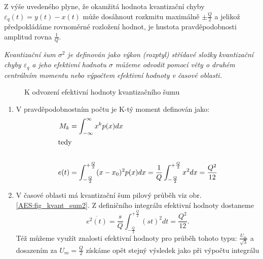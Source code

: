       Z výše uvedeného plyne, že okamžitá hodnota kvantizační chyby $\varepsilon_q(t) = y(t) - x(t)$ může dosáhnout rozkmitu maximálně $\pm \frac{Q}{2}$ a jelikož předpokládáme rovnoměrné rozložení hodnot, je hustota pravděpodobnosti amplitud rovna $\frac{1}{Q}$.

      \emph{Kvantizační šum $\sigma^2$ je definován jako výkon (rozptyl) střídavé složky kvantizační chyby $\varepsilon_q$ a jeho efektivní hodnotu $\sigma$ můžeme odvodit pomocí věty o druhém centrálním momentu nebo výpočtem efektivní hodnoty v časové oblasti.}

        \begin{figure}[ht!]
          \centering
          \caption{K odvození efektivní hodnoty kvantizačního šumu}
          \label{AES:fig_kvant_sum}
        \end{figure}

        \begin{enumerate}
          \item V pravděpodobnostním počtu je K-tý moment definován jako: 
                \begin{align*}
                  M_k  &= \int_{-\infty}^{\infty} x^k p(x)dx  \\
                  \shortintertext{tedy}                       \\
                  e(t) &= \int_{-\frac{Q}{2}}^{+\frac{Q}{2}}(x - x_0)^2p(x)dx = 
                                 \frac{1}{Q}\int_{-\frac{Q}{2}}^{+\frac{Q}{2}}x^2dx = \frac{Q^2}{12}
                \end{align*}
          \item V časové oblasti má kvantizační šum pilový průběh viz obr.    
                \ref{AES:fig_kvant_sum2}. Z  definičního integrálu efektivní hodnoty dostaneme $$ 
                \overline{e^2(t)} =               
                \frac{s}{Q}\int_{-\frac{Q}{2}}^{+\frac{Q}{2}}(st)^2dt = \frac{Q^2}{12}.$$ Též 
                můžeme využít znalosti efektivní hodnoty pro průběh tohoto typu: 
                $\frac{U_m}{\sqrt{3}}$ a dosazením za $U_m =\frac{Q}{2}$ získáme opět stejný 
                výsledek jako při výpočtu integrálu
        \end{enumerate}

